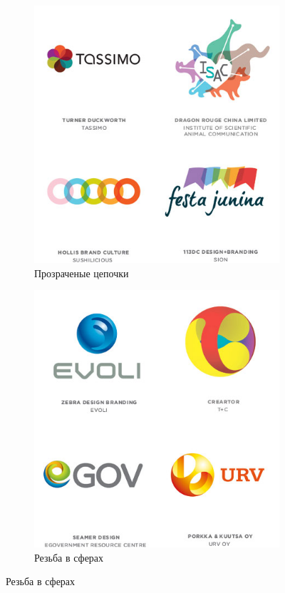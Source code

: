 \begin{figure}[h!]
  \ContinuedFloat
  \centering
  \begin{subfigure}{.45\textwidth}
    \centering
    \includegraphics[width=\linewidth]{images/supplement/logolounge/2012/Prozrachnie-zepochki.jpeg}
    \caption{Прозраченые цепочки}
    \label{fig:logolounge:2012:prozrachnie-zerpochki}
  \end{subfigure}
  \hfill
  \centering
  \begin{subfigure}{.45\textwidth}
    \centering
    \includegraphics[width=\linewidth]{images/supplement/logolounge/2012/Rezba-v-sferah.jpeg}
    \caption{Резьба в сферах}
    \label{fig:logolounge:2012:rezba-v-sferah}
  \end{subfigure}


\end{figure}
